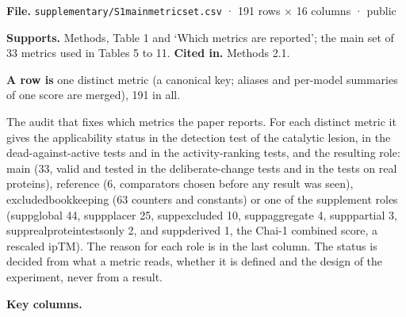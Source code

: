 \documentclass[
  10pt,
]{article}
\DeclareRobustCommand{\_}{\textunderscore\hspace{0pt}}
\begin{document}
\begin{shaded}\small

\textbf{File.}
\texttt{supplementary/S1\_main\_metric\_set.csv}
· 191 rows × 16
columns · public

\textbf{Supports.}
Methods, Table 1 and
`Which metrics are
reported'; the main
set of 33 metrics
used in Tables 5 to
11. \textbf{Cited
in.} Methods 2.1.

\textbf{A row is}
one distinct metric
(a canonical key;
aliases and
per-model summaries
of one score are
merged), 191 in all.

\end{shaded}

The audit that fixes
which metrics the
paper reports. For
each distinct metric
it gives the
applicability status
in the detection
test of the
catalytic lesion, in
the
dead-against-active
tests and in the
activity-ranking
tests, and the
resulting role: main
(33, valid and
tested in the
deliberate-change
tests and in the
tests on real
proteins), reference
(6, comparators
chosen before any
result was seen),
excluded\_bookkeeping
(63 counters and
constants) or one of
the supplement roles
(supp\_global 44,
supp\_placer 25,
supp\_excluded 10,
supp\_aggregate 4,
supp\_partial 3,
supp\_real\_protein\_tests\_only
2, and supp\_derived
1, the Chai-1
combined score, a
rescaled ipTM). The
reason for each role
is in the last
column. The status
is decided from what
a metric reads,
whether it is
defined and the
design of the
experiment, never
from a result.

\textbf{Key
columns.}
\end{document}

